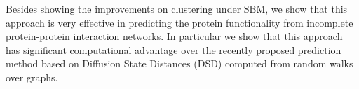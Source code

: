 \documentclass{article} %
\begin{document}
Besides showing the improvements on clustering under SBM, we show that this approach is very effective in predicting the protein functionality from incomplete protein-protein interaction networks. In particular we show that this approach has significant computational advantage over the recently proposed prediction method based on Diffusion State Distances (DSD) \cite{2013PLoSO...876339C} computed from random walks over graphs. 

%
%
\end{document}
